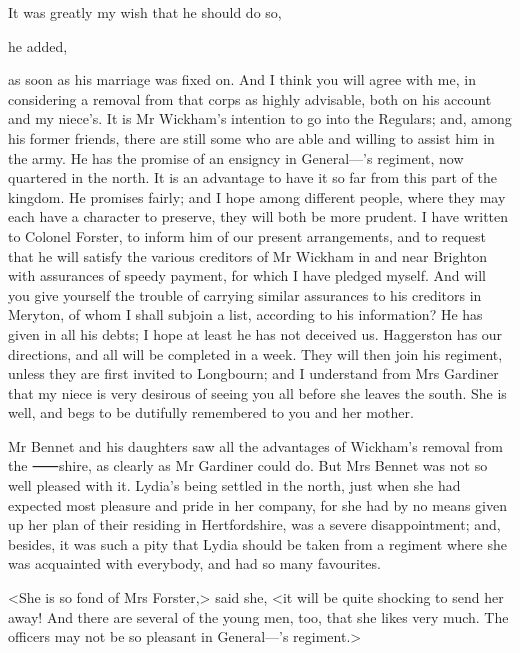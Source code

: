 \begin{mail}{}{}

\noindent It was greatly my wish that he should do so,

\pausemail


 he added, 

\resumemail

 \noindent as soon as his marriage was fixed on. And I think you will agree with me, in considering a removal from that corps as highly advisable, both on his account and my niece's. It is Mr Wickham's intention to go into the Regulars; and, among his former friends, there are still some who are able and willing to assist him in the army. He has the promise of an ensigncy in General—'s regiment, now quartered in the north. It is an advantage to have it so far from this part of the kingdom. He promises fairly; and I hope among different people, where they may each have a character to preserve, they will both be more prudent. I have written to Colonel Forster, to inform him of our present arrangements, and to request that he will satisfy the various creditors of Mr Wickham in and near Brighton with assurances of speedy payment, for which I have pledged myself. And will you give yourself the trouble of carrying similar assurances to his creditors in Meryton, of whom I shall subjoin a list, according to his information? He has given in all his debts; I hope at least he has not deceived us. Haggerston has our directions, and all will be completed in a week. They will then join his regiment, unless they are first invited to Longbourn; and I understand from Mrs Gardiner that my niece is very desirous of seeing you all before she leaves the south. She is well, and begs to be dutifully remembered to you and her mother.

\end{mail}


Mr Bennet and his daughters saw all the advantages of Wickham's removal from the ⸺shire, as clearly as Mr Gardiner could do. But Mrs Bennet was not so well pleased with it. Lydia's being settled in the north, just when she had expected most pleasure and pride in her company, for she had by no means given up her plan of their residing in Hertfordshire, was a severe disappointment; and, besides, it was such a pity that Lydia should be taken from a regiment where she was acquainted with everybody, and had so many favourites.

<She is so fond of Mrs Forster,> said she, <it will be quite shocking to send her away! And there are several of the young men, too, that she likes very much. The officers may not be so pleasant in General—'s regiment.>


